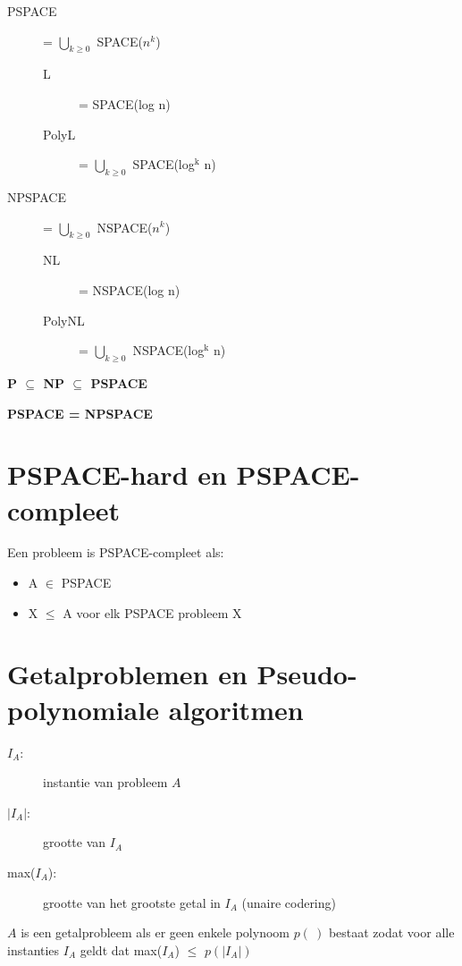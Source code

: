 \documentclass[]{article}
\begin{document}
\begin{description}
\item[PSPACE] = $\bigcup_{k \geq 0}$ SPACE($n^k$)
\begin{description}
\item[L] = SPACE(log n)
\item[PolyL] = $\bigcup_{k \geq 0}$ SPACE(log$^\text{k}$ n)
\end{description}

\medskip

\item[NPSPACE] = $\bigcup_{k \geq 0}$ NSPACE($n^k$)
\begin{description}
\item[NL] = NSPACE(log n)
\item[PolyNL] = $\bigcup_{k \geq 0}$ NSPACE(log$^\text{k}$ n)
\end{description}
\end{description}

\medskip

\textbf{P $\subseteq$ NP $\subseteq$ PSPACE}

\textbf{PSPACE = NPSPACE}

\section*{PSPACE-hard en PSPACE-compleet}

Een probleem is PSPACE-compleet als:

\begin{itemize}
\item A $\in$ PSPACE
\item X $\leq$ A voor elk PSPACE probleem X
\end{itemize}

\section*{Getalproblemen en Pseudo-polynomiale algoritmen}

\begin{description}
\item[$I_A$:] instantie van probleem $A$
\item[$|I_A|$:] grootte van $I_A$
\item[max($I_A$):] grootte van het grootste getal in $I_A$ (unaire codering)
\end{description}

$A$ is een getalprobleem als er geen enkele polynoom $p(~)$ bestaat zodat voor alle instanties $I_A$ geldt dat max($I_A$) $\leq$ $p(|I_A|)$
\end{document}
